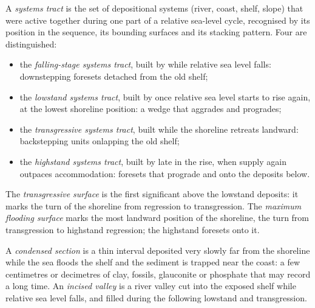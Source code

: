 \begin{definition}\label{def:b3:sequence-stratigraphy:tract}
A \emph{systems tract} is the set of depositional
systems (river, coast, shelf, slope) that were active together during one
part of a relative sea-level cycle, recognised by its position in the
sequence, its bounding surfaces and its stacking pattern. Four are
distinguished:
\begin{itemize}
\item the \emph{falling-stage systems tract},
  built by  while relative sea level falls:
  downstepping foresets detached from the old shelf;
\item the \emph{lowstand systems tract},
  built by  once relative sea level starts to rise again,
  at the lowest shoreline position: a wedge that aggrades and progrades;
\item the \emph{transgressive systems tract},
  built while the shoreline retreats landward: backstepping units
  onlapping the old shelf;
\item the \emph{highstand systems tract},
  built by  late in the rise, when supply again outpaces
  accommodation: foresets that prograde and  onto the deposits below.
\end{itemize}
\end{definition}

\begin{definition}\label{def:b3:sequence-stratigraphy:surfaces}
The \emph{transgressive surface} is the first
significant  above the lowstand deposits: it marks the turn
of the shoreline from regression to transgression. The \emph{maximum flooding
surface} marks the most landward position of
the shoreline, the turn from transgression to highstand regression; the
highstand foresets  onto it.
\end{definition}

\begin{definition}\label{def:b3:sequence-stratigraphy:condensed}
A \emph{condensed section} is a thin interval
deposited very slowly far from the shoreline while the sea floods the shelf
and the sediment is trapped near the coast: a few centimetres or decimetres
of clay, fossils, glauconite or phosphate that may record a long time. An
\emph{incised valley} is a river valley cut into the
exposed shelf while relative sea level falls, and filled during the
following lowstand and transgression.
\end{definition}

